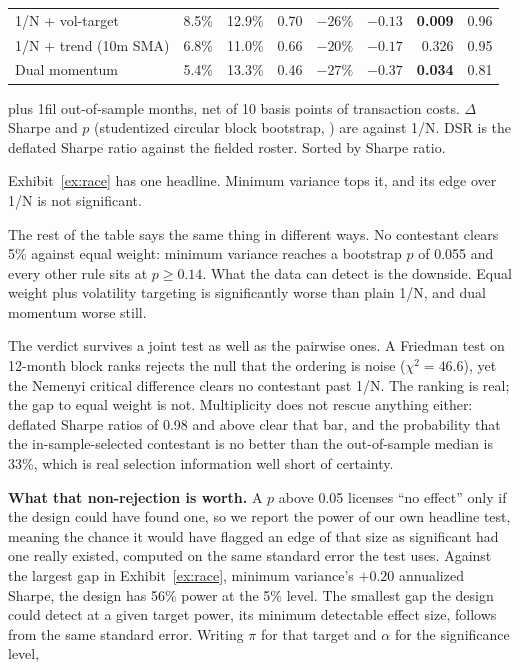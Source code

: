\documentclass[12pt,letterpaper]{article}
\newcounter{exhibit}
\newcommand{\exhibitflush}{%
  \leftskip=0pt\relax \rightskip=0pt\relax
  \parfillskip=0pt plus 1fil\relax \parindent=0pt\relax}
\newcommand{\exhibitnote}[1]{%
  \par\vspace{5pt}%
  {\exhibitflush\fontsize{8}{9.6}\selectfont #1\par}}
\newcommand{\head}[1]{\noindent\textbf{#1}\hspace{0.5em}\ignorespaces}
\begin{document}
\begin{table}[H]
\begin{tabular}{lrrrrrrr}
1/N + vol-target              &  8.5\% & 12.9\% & 0.70 & $-26$\% & $-0.13$ & \textbf{0.009} & 0.96 \\
1/N + trend (10m SMA)         &  6.8\% & 11.0\% & 0.66 & $-20$\% & $-0.17$ & 0.326 & 0.95 \\
Dual momentum                 &  5.4\% & 13.3\% & 0.46 & $-27$\% & $-0.37$ & \textbf{0.034} & 0.81 \\
\bottomrule
\end{tabular}
\exhibitnote{210 out-of-sample months, net of 10 basis points of transaction
costs. $\Delta$ Sharpe and $p$ (studentized circular block bootstrap,
\citealp{ledoit2008}) are against 1/N. DSR is the deflated Sharpe ratio against
the fielded roster. Sorted by Sharpe ratio.}
\end{table}

Exhibit~\ref{ex:race} has one headline. Minimum variance tops it, and its edge over 1/N is
not significant.

The rest of the table says the same thing in different ways. No contestant clears 5\% against
equal weight: minimum variance reaches a bootstrap $p$ of 0.055 and every other rule sits at
$p \ge 0.14$. What the data can detect is the downside. Equal weight plus volatility targeting
is significantly worse than plain 1/N, and dual momentum worse still.

The verdict survives a joint test as well as the pairwise ones. A Friedman test on 12-month
block ranks rejects the null that the ordering is noise ($\chi^{2} = 46.6$), yet the Nemenyi
critical difference clears no contestant past 1/N. The ranking is real; the gap to equal weight
is not. Multiplicity does not rescue anything either: deflated Sharpe ratios of 0.98 and above
clear that bar, and the probability that the in-sample-selected contestant is no better than
the out-of-sample median is 33\%, which is real selection information well short of
certainty.

\head{What that non-rejection is worth.} A $p$ above 0.05 licenses ``no effect''
only if the design could have found one, so we report the power of our own
headline test, meaning the chance it would have flagged an edge of that size as
significant had one really existed, computed on the same standard error the test
uses. Against the largest gap
in Exhibit~\ref{ex:race}, minimum variance's $+0.20$ annualized Sharpe, the design
has 56\% power at the 5\% level. The smallest gap the design could detect at a given target power, its minimum detectable effect size, follows from the same standard error. Writing $\pi$ for that target and $\alpha$ for the significance level,
\end{document}
